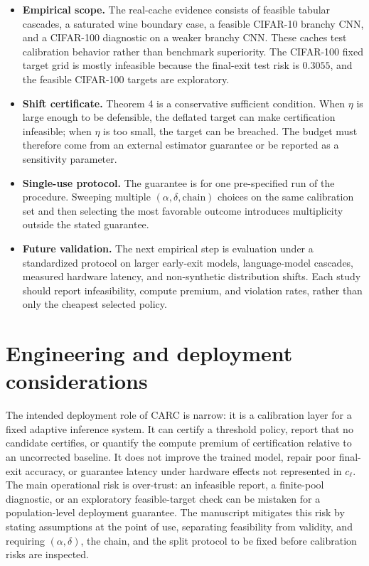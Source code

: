 \documentclass{ieeeaccess}
\begin{document}
\begin{itemize}
\item \textbf{Empirical scope.} The real-cache evidence consists of feasible tabular cascades, a saturated wine boundary case, a feasible CIFAR-10 branchy CNN, and a CIFAR-100 diagnostic on a weaker branchy CNN. These caches test calibration behavior rather than benchmark superiority. The CIFAR-100 fixed target grid is mostly infeasible because the final-exit test risk is $0.3055$, and the feasible CIFAR-100 targets are exploratory.
\item \textbf{Shift certificate.} Theorem 4 is a conservative sufficient condition. When $\eta$ is large enough to be defensible, the deflated target can make certification infeasible; when $\eta$ is too small, the target can be breached. The budget must therefore come from an external estimator guarantee or be reported as a sensitivity parameter.
\item \textbf{Single-use protocol.} The guarantee is for one pre-specified run of the procedure. Sweeping multiple $(\alpha,\delta,\text{chain})$ choices on the same calibration set and then selecting the most favorable outcome introduces multiplicity outside the stated guarantee.
\item \textbf{Future validation.} The next empirical step is evaluation under a standardized protocol on larger early-exit models, language-model cascades, measured hardware latency, and non-synthetic distribution shifts. Each study should report infeasibility, compute premium, and violation rates, rather than only the cheapest selected policy.
\end{itemize}

\section{Engineering and deployment considerations}

The intended deployment role of CARC is narrow: it is a calibration layer for a fixed adaptive inference system. It can certify a threshold policy, report that no candidate certifies, or quantify the compute premium of certification relative to an uncorrected baseline. It does not improve the trained model, repair poor final-exit accuracy, or guarantee latency under hardware effects not represented in $c_\ell$. The main operational risk is over-trust: an infeasible report, a finite-pool diagnostic, or an exploratory feasible-target check can be mistaken for a population-level deployment guarantee. The manuscript mitigates this risk by stating assumptions at the point of use, separating feasibility from validity, and requiring $(\alpha,\delta)$, the chain, and the split protocol to be fixed before calibration risks are inspected.
\end{document}
